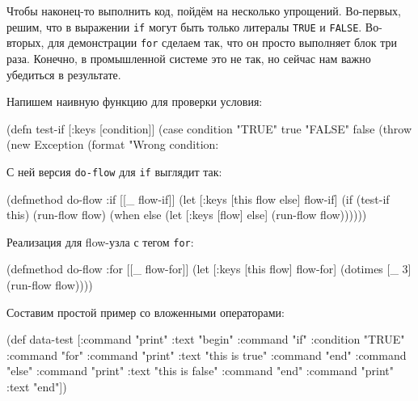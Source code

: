 Чтобы наконец-то выполнить код, пойдём на несколько упрощений. Во-первых,
решим, что в выражении \texttt{if} могут быть только литералы \texttt{TRUE} и
\texttt{FALSE}. Во-вторых, для демонстрации \texttt{for} сделаем так, что он
просто выполняет блок три раза. Конечно, в промышленной системе это не так, но
сейчас нам важно убедиться в результате.

Напишем наивную функцию для проверки условия:

\begin{english}
  \begin{clojure}
(defn test-if [{:keys [condition]}]
  (case condition
    "TRUE" true
    "FALSE" false
    (throw
     (new Exception
          (format "Wrong condition: %
  \end{clojure}
\end{english}

С ней версия \texttt{do-flow} для \texttt{if} выглядит так:

\begin{english}
  \begin{clojure}
(defmethod do-flow :if
  [[_ flow-if]]
  (let [{:keys [this flow else]} flow-if]
    (if (test-if this)
      (run-flow flow)
      (when else
        (let [{:keys [flow]} else]
          (run-flow flow))))))
  \end{clojure}
\end{english}

Реализация для flow-узла с тегом \texttt{for}:

\begin{english}
  \begin{clojure}
(defmethod do-flow :for
  [[_ flow-for]]
  (let [{:keys [this flow]} flow-for]
    (dotimes [_ 3]
      (run-flow flow))))
  \end{clojure}
\end{english}

Составим простой пример со вложенными операторами:

\begin{english}
  \begin{clojure}
(def data-test
  [{:command "print" :text "begin"}
   {:command "if" :condition "TRUE"}
     {:command "for"}
       {:command "print" :text "this is true"}
     {:command "end"}
   {:command "else"}
     {:command "print" :text "this is false"}
   {:command "end"}
   {:command "print" :text "end"}])
  \end{clojure}
\end{english}

